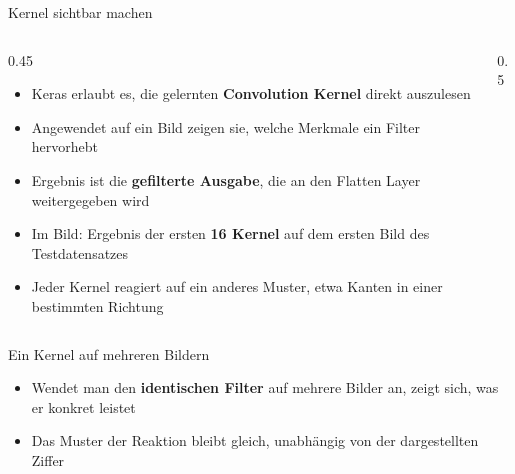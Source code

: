 \begin{frame}{Kernel sichtbar machen}
\begin{columns}

\begin{column}{0.45\textwidth}
\footnotesize
\begin{itemize}
  \item Keras erlaubt es, die gelernten \textbf{Convolution Kernel} direkt auszulesen
  \item Angewendet auf ein Bild zeigen sie, welche Merkmale ein Filter hervorhebt
  \item Ergebnis ist die \textbf{gefilterte Ausgabe}, die an den Flatten Layer weitergegeben wird
  \item Im Bild: Ergebnis der ersten \textbf{16 Kernel} auf dem ersten Bild des Testdatensatzes
  \item Jeder Kernel reagiert auf ein anderes Muster, etwa Kanten in einer bestimmten Richtung
\end{itemize}
\end{column}
\vspace{-1.0cm}
\begin{column}{0.5\textwidth}

\end{column}
\end{columns}
\end{frame}


\begin{frame}{Ein Kernel auf mehreren Bildern}
\medskip
\footnotesize
\begin{itemize}
  \item Wendet man den \textbf{identischen Filter} auf mehrere Bilder an, zeigt sich, was er konkret leistet
  \item Das Muster der Reaktion bleibt gleich, unabhängig von der dargestellten Ziffer
\end{itemize}
\begin{center}

\end{center}
\end{frame}



\makequestionspage{\FRAGENIMAGE}


